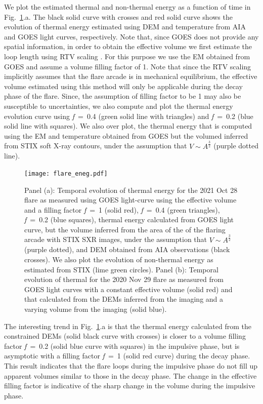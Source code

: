 We plot the estimated thermal and non-thermal energy as a function of time in Fig.~\ref{fig:eneg}.a. The black solid curve with crosses and red solid curve shows the evolution of thermal energy estimated using DEM and temperature from AIA and GOES light curves, respectively. Note that, since GOES does not provide any spatial information, in order to obtain the effective volume we first estimate the loop length using RTV scaling \citep{rtv78,serio91}. For this purpose we use the EM obtained from GOES and assume a volume filling factor of 1. Note that since the RTV scaling implicitly assumes that the flare arcade is in mechanical equilibrium, the effective volume estimated using this method will only be applicable during the decay phase of the flare. Since, the assumption of filling factor to be 1 may also be susceptible to uncertainties, we also compute and plot the thermal energy evolution curve using \textit{f}~=~0.4 (green solid line with triangles) and \textit{f}~=~0.2 (blue solid line with squares). We also over plot, the thermal energy that is computed using the EM and temperature obtained from GOES but the volumed inferred from STIX soft X-ray contours, under the assumption that $V\sim A^{\frac{3}{2}}$ (purple dotted line).

\begin{figure}[ht!]
    \centering
    \texttt{[image: flare\_eneg.pdf]}
    \caption[Temporal evolution of the thermal and non-thermal energy for both flares.]{Panel (a): Temporal evolution of thermal energy for the 2021 Oct 28 flare as measured using GOES light-curve using the effective volume and a filling factor \textit{f}~=~1 (solid red), \textit{f}~=~0.4 (green triangles), \textit{f}~=~0.2 (blue squares), thermal energy calculated from GOES light curve, but the volume inferred from the area of the of the flaring arcade with STIX SXR images, under the assumption that $V\sim A^{\frac{3}{2}}$ (purple dotted), and DEM obtained from AIA observations (black crosses). We also plot the evolution of non-thermal energy as estimated from STIX (lime green circles). Panel (b): Temporal evolution of thermal for the 2020 Nov 29 flare as measured from GOES light curves with a constant effective volume (solid red) and that calculated from the DEMs inferred from the imaging and a varying volume from the imaging (solid blue).}
    \label{fig:eneg}
\end{figure}

The interesting trend in Fig.~\ref{fig:eneg}.a is that the thermal energy calculated from the constrained DEMs (solid black curve with crosses) is closer to a volume filling factor \textit{f}~=~0.2 (solid blue curve with squares) in the impulsive phase, but is asymptotic with a filling factor \textit{f}~=~1 (solid red curve) during the decay phase. This result indicates that the flare loops during the impulsive phase do not fill up apparent volumes similar to those in the decay phase. The change in the effective filling factor is indicative of the sharp change in the volume during the impulsive phase.

